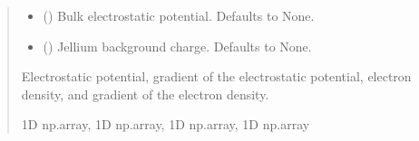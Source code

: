 \documentclass[letterpaper,10pt,english]{sphinxmanual}
\begin{document}
\begin{fulllineitems}
\begin{fulllineitems}
\begin{quote}
\begin{description}
\begin{itemize}
\item {} 
\sphinxAtStartPar
{} (\sphinxstyleliteralemphasis{\sphinxupquote{, }}) \textendash{} Bulk electrostatic potential. Defaults to None.

\item {} 
\sphinxAtStartPar
{} (\sphinxstyleliteralemphasis{\sphinxupquote{, }}) \textendash{} Jellium background charge. Defaults to None.

\end{itemize}

\sphinxAtStartPar
Electrostatic potential, gradient of the electrostatic potential, electron density, and gradient of the electron density.

\sphinxAtStartPar
1D np.array, 1D np.array, 1D np.array, 1D np.array

\end{description}\end{quote}

\end{fulllineitems}


\begin{fulllineitems}
\label{\detokenize{fcdft.jellium:fcdft.jellium.jellium.Jellium.kernel}}
\pysigstartsignatures
\pysiglinewithargsret
{}
{}
{}
\pysigstopsignatures
\end{fulllineitems}


\end{fulllineitems}

\end{document}
